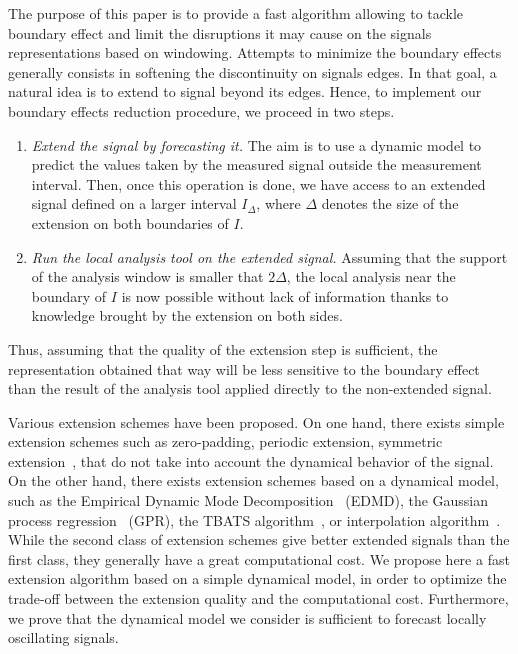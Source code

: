 \documentclass[journal]{IEEEtran}
\begin{document}
The purpose of this paper is to provide a fast algorithm allowing to tackle boundary effect and limit the disruptions it may cause on the signals representations based on windowing. Attempts to minimize the boundary effects generally consists in softening the discontinuity on signals edges. In that goal, a natural idea is to extend to signal beyond its edges. Hence, to implement our boundary effects reduction procedure, we proceed in two steps.
\begin{enumerate}
\item \emph{Extend the signal by forecasting it.} The aim is to use a dynamic model to predict the values taken by the measured signal outside the measurement interval. Then, once this operation is done, we have access to an extended signal defined on a larger interval $I_\Delta$, where $\Delta$ denotes the size of the extension on both boundaries of $I$.
\item \emph{Run the local analysis tool on the extended signal.} Assuming that the support of the analysis window is smaller that $2\Delta$, the local analysis near the boundary of $I$ is now possible without lack of information thanks to knowledge brought by the extension on both sides. 
\end{enumerate}
Thus, assuming that the quality of the extension step is sufficient, the representation obtained that way will be less sensitive to the boundary effect than the result of the analysis tool applied directly to the non-extended signal. 

Various extension schemes have been proposed. On one hand, there exists simple extension schemes such as zero-padding, periodic extension, symmetric extension~\cite{Kharitonenko02wavelet}, that do not take into account the dynamical behavior of the signal. On the other hand, there exists extension schemes based on a dynamical model, such as the Empirical Dynamic Mode Decomposition~\cite{Williams15data} (EDMD), the Gaussian process regression~\cite{Rasmussen06gaussian} (GPR), the TBATS algorithm~\cite{DeLivera11forecasting}, or interpolation algorithm~\cite{Su13adaptive}.  While the second class of extension schemes give better extended signals than the first class, they generally have a great computational cost. We propose here a fast extension algorithm based on a simple dynamical model, in order to optimize the trade-off between the extension quality and the computational cost. Furthermore, we prove that the dynamical model we consider is sufficient to forecast locally oscillating signals.
\end{document}
